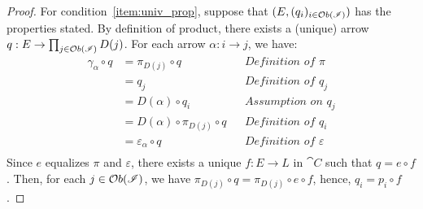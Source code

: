 \documentclass[a4paper, twoside,openright]{report}
\theoremstyle{plain}
\theoremstyle{definition}
\begin{document}
\begin{proof}
    For condition~\ref{item:univ_prop}, suppose that $(E, (q_i)_{i \in \mathcal{O}b(\mathscr{I})})$ has the properties stated. By definition of product, there exists a (unique) arrow $q: E \rightarrow \prod_{j \in \mathcal{O}b(\mathscr{I})}D(j)$. For each arrow $\alpha: i \rightarrow j$, we have:
    \begin{align*}
            \gamma_\alpha \circ q 
                &= \pi_{D(j)} \circ q           && \textit{Definition of $\pi$} \\
                &= q_j                          && \textit{Definition of $q_j$} \\
                &= D(\alpha) \circ q_i          && \textit{Assumption on $q_j$} \\
                &= D(\alpha) \circ \pi_{D(j)} \circ q   &&\textit{Definition of $q_i$} \\
                &= \varepsilon_{\alpha} \circ q && \textit{Definition of $\varepsilon$} \\
    \end{align*}
    Since $e$ equalizes $\pi$ and $\varepsilon$, there exists a unique $f: E \rightarrow L$ in $\cat C$ such that $q = e \circ f$. Then, for each $j \in \mathcal{O}b(\mathscr{I})$, we have $\pi_{D(j)} \circ q = \pi_{D(j)} \circ e \circ f$, hence, $q_i = p_i \circ f$.
\end{proof}



 		


\end{document}
